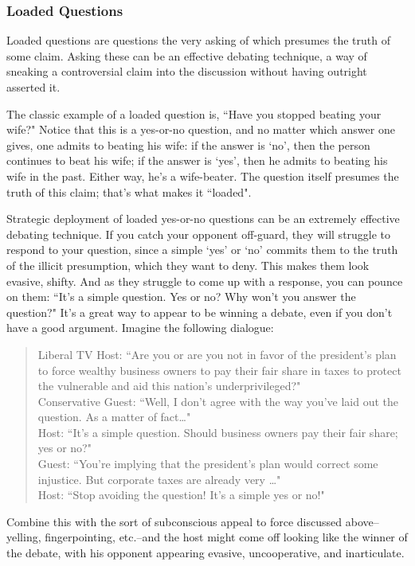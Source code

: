 \subsubsection{Loaded Questions}
Loaded questions are questions the very asking of which presumes the truth of some claim. Asking
these can be an effective debating technique, a way of sneaking a controversial claim into the
discussion without having outright asserted it.

The classic example of a loaded question is, ``Have you stopped beating your wife?" Notice that
this is a yes-or-no question, and no matter which answer one gives, one admits to beating his wife:
if the answer is `no', then the person continues to beat his wife; if the answer is `yes', then he
admits to beating his wife in the past. Either way, he's a wife-beater. The question itself presumes
the truth of this claim; that's what makes it ``loaded".

Strategic deployment of loaded yes-or-no questions can be an extremely effective debating
technique. If you catch your opponent off-guard, they will struggle to respond to your question,
since a simple `yes' or `no' commits them to the truth of the illicit presumption, which they want
to deny. This makes them look evasive, shifty. And as they struggle to come up with a response,
you can pounce on them: ``It's a simple question. Yes or no? Why won't you answer the question?"
It's a great way to appear to be winning a debate, even if you don't have a good argument. Imagine
the following dialogue:

\begin{quote}
Liberal TV Host: ``Are you or are you not in favor of the president's plan to force wealthy
business owners to pay their fair share in taxes to protect the vulnerable and aid this nation's
underprivileged?" \\
Conservative Guest: ``Well, I don't agree with the way you've laid out the question. As a
matter of fact\dots" \\
Host: ``It's a simple question. Should business owners pay their fair share; yes or no?" \\
Guest: ``You're implying that the president's plan would correct some injustice. But
corporate taxes are already very \dots" \\
Host: ``Stop avoiding the question! It's a simple yes or no!" \\
\end{quote}

Combine this with the sort of subconscious appeal to force discussed above--yelling, fingerpointing, etc.--and 
the host might come off looking like the winner of the debate, with his
opponent appearing evasive, uncooperative, and inarticulate.

